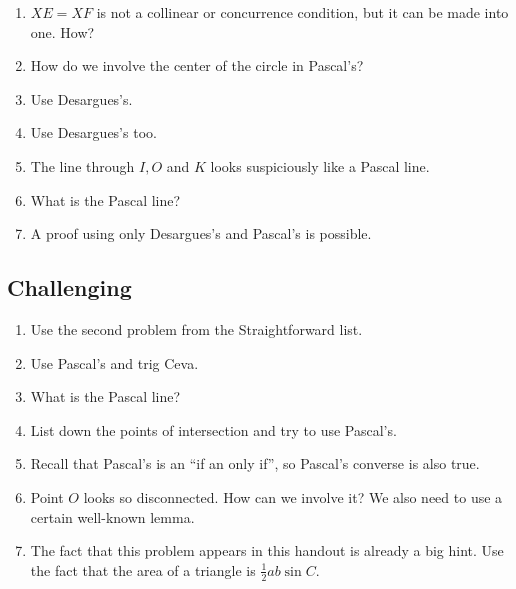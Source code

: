 \documentclass[11pt,paper=letter]{scrartcl}
\begin{document}
\begin{enumerate}

\item $XE = XF$ is not a collinear or concurrence condition, but it can be made into one. How?

\item How do we involve the center of the circle in Pascal's?

\item Use Desargues's.

\item Use Desargues's too.

\item The line through $I, O$ and $K$ looks suspiciously like a Pascal line.

\item What is the Pascal line?

\item A proof using only Desargues's and Pascal's is possible.

\end{enumerate}

\subsection{Challenging}

\begin{enumerate}

\item Use the second problem from the Straightforward list.

\item Use Pascal's and trig Ceva.

\item What is the Pascal line?

\item List down the points of intersection and try to use Pascal's.

\item Recall that Pascal's is an ``if an only if'', so Pascal's converse is also true.

\item Point $O$ looks so disconnected. How can we involve it? We also need to use a certain well-known lemma.

\item The fact that this problem appears in this handout is already a big hint. Use the fact that the area of a triangle is $\frac{1}{2}ab \sin C$.

\end{enumerate}
\end{document}
